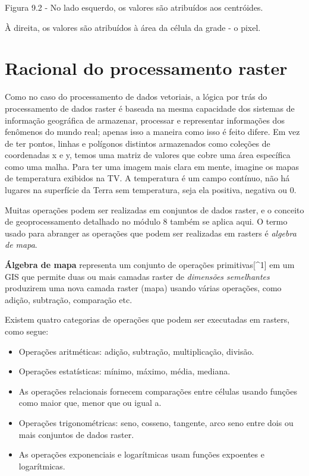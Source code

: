 \documentclass[
  portuguese,
]{krantz}
\providecommand{\tightlist}{%
  \setlength{\itemsep}{0pt}\setlength{\parskip}{0pt}}
\begin{document}
Figura 9.2 - No lado esquerdo, os valores são atribuídos aos centróides.

À direita, os valores são atribuídos à área da célula da grade - o pixel.

\hypertarget{racional-do-processamento-raster}{%
\section{Racional do processamento raster}\label{racional-do-processamento-raster}}

Como no caso do processamento de dados vetoriais, a lógica por trás do processamento de dados raster é baseada na mesma capacidade dos sistemas de informação geográfica de armazenar, processar e representar informações dos fenômenos do mundo real; apenas isso a maneira como isso é feito difere. Em vez de ter pontos, linhas e polígonos distintos armazenados como coleções de coordenadas x e y, temos uma matriz de valores que cobre uma área específica como uma malha. Para ter uma imagem mais clara em mente, imagine os mapas de temperatura exibidos na TV. A temperatura é um campo contínuo, não há lugares na superfície da Terra sem temperatura, seja ela positiva, negativa ou 0.

Muitas operações podem ser realizadas em conjuntos de dados raster, e o conceito de geoprocessamento detalhado no módulo 8 também se aplica aqui. O termo usado para abranger as operações que podem ser realizadas em rasters é \emph{algebra de mapa}.

\textbf{Álgebra de mapa} representa um conjunto de operações primitivas{[}\^{}1{]} em um GIS que permite duas ou mais camadas raster de \emph{dimensões semelhantes} produzirem uma nova camada raster (mapa) usando várias operações, como adição, subtração, comparação etc.

Existem quatro categorias de operações que podem ser executadas em rasters, como segue:

\begin{itemize}
\tightlist
\item
  Operações aritméticas: adição, subtração, multiplicação, divisão.
\item
  Operações estatísticas: mínimo, máximo, média, mediana.
\item
  As operações relacionais fornecem comparações entre células usando funções como maior que, menor que ou igual a.
\item
  Operações trigonométricas: seno, cosseno, tangente, arco seno entre dois ou mais conjuntos de dados raster.
\item
  As operações exponenciais e logarítmicas usam funções expoentes e logarítmicas.
\end{itemize}
\end{document}
